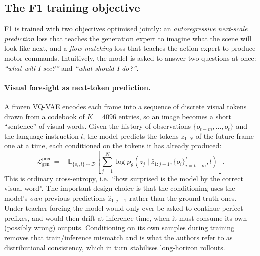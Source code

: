 
\subsection{The F1 training objective}

F1 is trained with two objectives optimised jointly: an \emph{autoregressive
next-scale prediction} loss that teaches the generation expert to imagine what
the scene will look like next, and a \emph{flow-matching} loss that teaches the
action expert to produce motor commands. Intuitively, the model is asked to
answer two questions at once: \emph{``what will I see?''} and \emph{``what
should I do?''}.

\paragraph{Visual foresight as next-token prediction.}
A frozen VQ-VAE encodes each frame into a sequence of discrete visual tokens
drawn from a codebook of $K=4096$ entries, so an image becomes a short
``sentence'' of visual words. Given the history of observations
$\{o_{t-m},\dots,o_t\}$ and the language instruction $l$, the model predicts the
tokens $z_{1:N}$ of the future frame one at a time, each conditioned on the
tokens it has already produced:
\begin{equation}
    \mathcal{L}^{\mathrm{pred}}_{\mathrm{gen}}
    = -\,\mathbb{E}_{\{o_i,l\}\sim\mathcal{D}}
      \left[\sum_{j=1}^{N} \log p_\theta\!\left(z_j \mid \hat{z}_{1:j-1},
      \{o_i\}_{i=t-m}^{t}, l\right)\right].
    \label{eq:gen}
\end{equation}
This is ordinary cross-entropy, i.e.\ ``how surprised is the model by the
correct visual word''. The important design choice is that the conditioning uses
the model's \emph{own} previous predictions $\hat{z}_{1:j-1}$ rather than the
ground-truth ones. Under teacher forcing the model would only ever be asked to
continue perfect prefixes, and would then drift at inference time, when it must
consume its own (possibly wrong) outputs. Conditioning on its own samples during
training removes that train/inference mismatch and is what the authors refer to
as distributional consistency, which in turn stabilises long-horizon rollouts.

